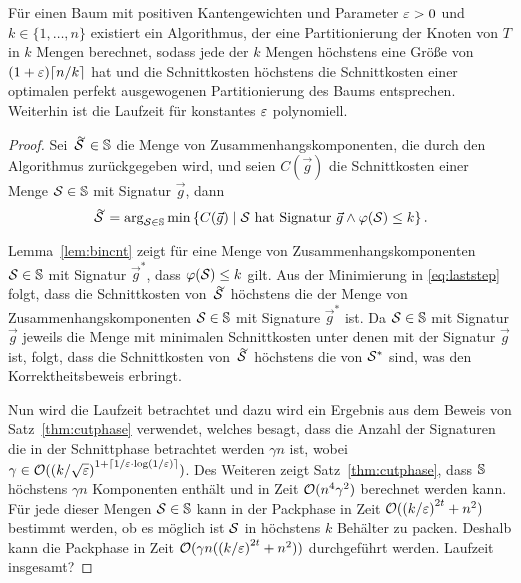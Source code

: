     \begin{thm}\label{thm:treealg}
        Für einen Baum mit positiven Kantengewichten und Parameter $\varepsilon > 0$ und $k \in \{1, \ldots, n\}$ existiert ein Algorithmus, der eine Partitionierung der Knoten von $T$ in $k$ Mengen berechnet, sodass jede der $k$ Mengen höchstens eine Größe von $(1 + \eps) \ceil*{n/k}$ hat und die Schnittkosten höchstens die Schnittkosten einer optimalen perfekt ausgewogenen Partitionierung des Baums entsprechen. 
        Weiterhin ist die Laufzeit für konstantes $\varepsilon$ polynomiell.
    \end{thm}
    \begin{proof}
        Sei $\tildaS \in \bbS$ die Menge von Zusammenhangskomponenten, die durch den Algorithmus zurückgegeben wird, und seien $C(\vec{g})$ die Schnittkosten einer Menge $\mathcal{S} \in \mathbb{S}$ mit Signatur $\vec{g}$, dann
        \begin{equation}\label{eq:laststep}
            \tildaS = \arg_{\calS \in \bbS} \min \left\{ C(\vec{g}) \mid \calS\ \text{hat Signatur}\ \vec{g} \land \varphi(\calS) \leq k \right\}.
        \end{equation}

    Lemma~\ref{lem:bincnt} zeigt für eine Menge von Zusammenhangskomponenten $\mathcal{S} \in \mathbb{S}$ mit Signatur $\vec{g}^*$, dass $\varphi(\mathcal{S}) \leq k$ gilt.
    Aus der Minimierung in \eqref{eq:laststep} folgt, dass die Schnittkosten von $\tildaS$ höchstens die der Menge von Zusammenhangskomponenten $\mathcal{S} \in \mathbb{S}$ mit Signature $\vec{g}^*$ ist.
    Da $\mathcal{S} \in \mathbb{S}$ mit Signatur $\vec{g}$ jeweils die Menge mit minimalen Schnittkosten unter denen mit der Signatur $\vec{g}$ ist, folgt, dass die Schnittkosten von $\tildaS$ höchstens die von $\mathcal{S}^*$ sind, was den Korrektheitsbeweis erbringt.

        Nun wird die Laufzeit betrachtet und dazu wird ein Ergebnis aus dem Beweis von Satz~\ref{thm:cutphase} verwendet, welches besagt, dass die Anzahl der Signaturen die in der Schnittphase betrachtet werden $\gamma n$ ist, wobei $\gamma \in \mathcal{O}({(k/\sqrt{\varepsilon})}^{1 + \lceil1/\varepsilon \cdot \log(1/\varepsilon)\rceil})$. 
        Des Weiteren zeigt Satz~\ref{thm:cutphase}, dass $\mathbb{S}$ höchstens $\gamma n$ Komponenten enthält und in Zeit $\mathcal{O}(n^4 \gamma^2)$ berechnet werden kann. 
        Für jede dieser Mengen $\mathcal{S} \in \mathbb{S}$ kann in der Packphase in Zeit $\mathcal{O}({(k/\varepsilon)}^{2t} + n^2)$ bestimmt werden, ob es möglich ist $\mathcal{S}$ in höchstens $k$ Behälter zu packen.
        Deshalb kann die Packphase in Zeit $\mathcal{O}(\gamma n ({(k/\varepsilon)}^{2t} + n^2))$ durchgeführt werden.
         Laufzeit insgesamt?
    \end{proof}
    
